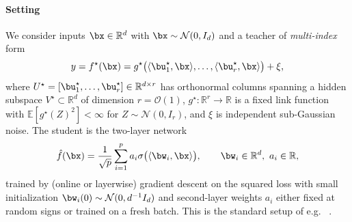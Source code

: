 \paragraph{Setting}
We consider inputs $\bx\in\mathbb{R}^d$ with $\bx\sim\mathcal{N}(0,I_d)$ and a teacher of \emph{multi-index} form
\begin{equation}\label{2605:eq:mim-teacher}
y  =  f^\star(\bx)  =  g^\star \bigl(\langle \bu^\star_1,\bx\rangle,\dots,\langle \bu^\star_r,\bx\rangle\bigr) + \xi,
\end{equation}
where $U^\star=[\bu^\star_1,\dots,\bu^\star_r]\in\mathbb{R}^{d\times r}$ has orthonormal columns spanning a hidden subspace $V^\star\subset\mathbb{R}^{d}$ of dimension $r=\mathcal{O}(1)$, $g^\star:\mathbb{R}^r\to\mathbb{R}$ is a fixed link function with $\mathbb{E}[g^\star(Z)^2]<\infty$ for $Z\sim\mathcal{N}(0,I_r)$, and $\xi$ is independent sub-Gaussian noise. The student is the two-layer network
\begin{equation}\label{2605:eq:two-layer-student}
\hat f(\bx)  =  \frac{1}{\sqrt{p}}\sum_{i=1}^{p} a_i \sigma \bigl(\langle\bw_i,\bx\rangle\bigr),\qquad \bw_i\in\mathbb{R}^d,\ a_i\in\mathbb{R},
\end{equation}
trained by (online or layerwise) gradient descent on the squared loss with small initialization $\bw_i(0)\sim\mathcal{N}(0,d^{-1}I_d)$ and second-layer weights $a_i$ either fixed at random signs or trained on a fresh batch. This is the standard setup of e.g. ~\cite{goldt2019dynamics,arnaboldi2023high,benarous2024stochastic,bietti2023learning,abbe2023sgd,dandi2024benefits}.

